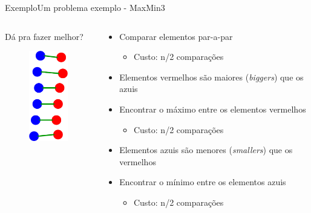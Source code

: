 \documentclass[aspectratio=169]{beamer}
\begin{document}
\begin{frame}{Exemplo}{Um problema exemplo - MaxMin3}
\begin{columns}[T] %
\begin{column}{.28\textwidth}
Dá pra fazer melhor?
\begin{figure}[!ht]
  \includegraphics[width=60pt]{imgs/maxmin3_1.png}
\end{figure}
\end{column}%
\hfill%
\begin{column}{.68\textwidth}
\begin{itemize}
\item Comparar elementos par-a-par
\begin{itemize}
\item Custo: n/2 comparações
\end{itemize}
\item Elementos vermelhos são maiores ({\it biggers}) que os azuis
\item Encontrar o máximo entre os elementos vermelhos
\begin{itemize}
\item Custo: n/2 comparações
\end{itemize}
\item Elementos azuis são menores ({\it smallers}) que os vermelhos
\item Encontrar o mínimo entre os elementos azuis
\begin{itemize}
\item Custo: n/2 comparações
\end{itemize}
\end{itemize}
\end{column}%
\end{columns}
\end{frame}

\end{document}
